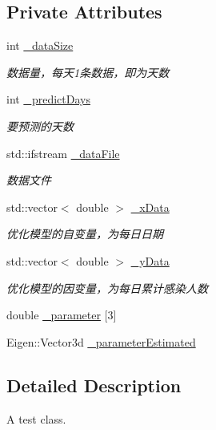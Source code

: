 \subsection*{Private Attributes}
\begin{DoxyCompactItemize}
\item 
int \hyperlink{classnCoV_a7182f86ff0f0f607cd461ebe738fb9da}{\+\_\+data\+Size}
\begin{DoxyCompactList}\small\item\em 数据量，每天1条数据，即为天数 \end{DoxyCompactList}\item 
int \hyperlink{classnCoV_a71d73f9132ff05684bb8f830bd1f4232}{\+\_\+predict\+Days}
\begin{DoxyCompactList}\small\item\em 要预测的天数 \end{DoxyCompactList}\item 
std\+::ifstream \hyperlink{classnCoV_a9585e58cac7c3c4cf26fe0291b809f06}{\+\_\+data\+File}
\begin{DoxyCompactList}\small\item\em 数据文件 \end{DoxyCompactList}\item 
std\+::vector$<$ double $>$ \hyperlink{classnCoV_a11802f3972f62a07b77b1847f1d010a8}{\+\_\+x\+Data}
\begin{DoxyCompactList}\small\item\em 优化模型的自变量，为每日日期 \end{DoxyCompactList}\item 
std\+::vector$<$ double $>$ \hyperlink{classnCoV_a8e122688ffc8ee32df05f0cb6ef25920}{\+\_\+y\+Data}
\begin{DoxyCompactList}\small\item\em 优化模型的因变量，为每日累计感染人数 \end{DoxyCompactList}\item 
double \hyperlink{classnCoV_ae34cb58fd08703599158b69853b659a2}{\+\_\+parameter} \mbox{[}3\mbox{]}
\item 
Eigen\+::\+Vector3d \hyperlink{classnCoV_a6980bf4492a8ce437b15ac9625eacfce}{\+\_\+parameter\+Estimated}
\end{DoxyCompactItemize}


\subsection{Detailed Description}
A test class.

